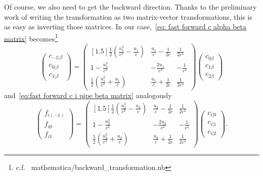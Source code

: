 Of course, we also need to get the backward direction.
Thanks to the preliminary work of writing the transformation as two matrix-vector transformations, this is as easy as inverting those matrices.
In our case,~\eqref{eq: fast forward c alpha beta matrix} becomes\footnote{c.f.~\cite{gitrepo_MastersThesis} mathematica/backward\_transformation.nb}
\begin{equation}
  \label{eq:fast backward c i pipe beta matrix}
  \begin{pmatrix}
    c_{-1|\beta} \\
    c_{0|\beta} \\
    c_{1|\beta}
  \end{pmatrix}
  =  \begin{pmatrix}[1.5]
    \frac{1}{2}\left(\frac{u_1^2}{c^2}-\frac{u_1}{c}\right)
    & \frac{u_1}{c} - \frac{1}{2c}
    & \frac{1}{2 c^2}
    \\
    1-\frac{u_1^2}{c^2}
    & -\frac{2 u_1}{c^2}
    & -\frac{1}{c^2}
    \\
    \frac{1}{2}\left(\frac{u_1^2}{c^2}+\frac{u_1}{c}\right)
    & \frac{u_1}{c} + \frac{1}{2c}
    & \frac{1}{2 c^2}
  \end{pmatrix}
  \begin{pmatrix}
    c_{0\beta} \\
    c_{1\beta} \\
    c_{2\beta}
  \end{pmatrix}
\end{equation}
and~\eqref{eq:fast forward c i pipe beta matrix} analogously
\begin{equation}
  \label{eq:fast backward f i pipe beta matrix}
  \begin{pmatrix}
    f_{i(-1)} \\
    f_{i0} \\
    f_{i1}
  \end{pmatrix}
  =
  \begin{pmatrix}[1.5]
    \frac{1}{2}\left(\frac{u_2^2}{c^2}-\frac{u_2}{c}\right)
    & \frac{u_2}{c} - \frac{1}{2c}
    & \frac{1}{2 c^2}
    \\
    1-\frac{u_2^2}{c^2}
    & -\frac{2 u_2}{c^2}
    & -\frac{1}{c^2}
    \\
    \frac{1}{2}\left(\frac{u_2^2}{c^2}+\frac{u_2}{c}\right)
    & \frac{u_2}{c} + \frac{1}{2c}
    & \frac{1}{2 c^2}
  \end{pmatrix}
  \begin{pmatrix}
      c_{i|0} \\
      c_{i|1} \\
      c_{i|2}
    \end{pmatrix}.
\end{equation}
